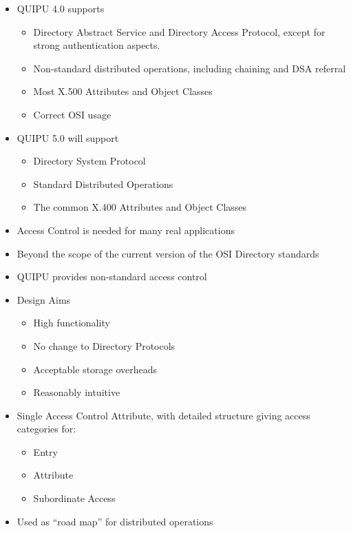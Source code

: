 \begin {bwslide}
\begin {itemize}
\item QUIPU 4.0 supports
\begin {itemize}
\item Directory Abstract Service and Directory Access Protocol, except for
strong authentication aspects.
\item Non-standard distributed operations, including chaining and DSA
referral
\item Most X.500 Attributes and Object Classes
\item Correct OSI usage
\end {itemize}
\item QUIPU 5.0 will support
\begin {itemize}
\item Directory System Protocol
\item Standard Distributed Operations
\item The common X.400 Attributes and Object Classes
\end {itemize}

\end {itemize}
\end {bwslide}

\begin {bwslide}

\begin {itemize}
\item Access Control is needed for many real applications
\item Beyond the scope of the current version of the OSI Directory standards
\item QUIPU provides non-standard access control
\item Design Aims
\begin {itemize}
\item High functionality
\item No change to Directory Protocols
\item Acceptable storage overheads
\item Reasonably intuitive
\end {itemize}

\item Single Access Control Attribute, with detailed structure giving access
categories for:
\begin {itemize}
\item Entry
\item Attribute
\item Subordinate Access
\end {itemize}

\item Used as ``road map'' for distributed operations
\end {itemize}
\end {bwslide}

